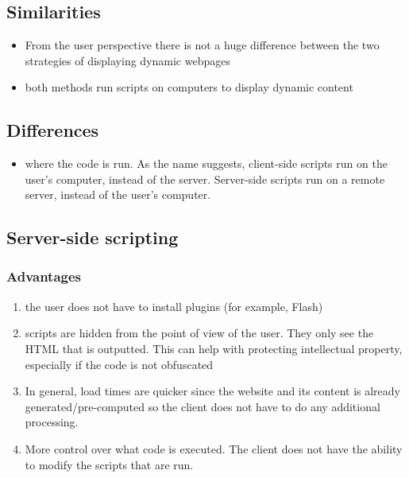 \section{}

\subsection*{Similarities}
\begin{itemize}
  \item From the user perspective there is not a huge difference between the two
    strategies of displaying dynamic webpages
  \item both methods run scripts on computers to display dynamic content
\end{itemize}

\subsection*{Differences}
\begin{itemize}
  \item where the code is run. As the name suggests, client-side scripts run on
    the user's computer, instead of the server. Server-side scripts run on a
    remote server, instead of the user's computer. 
\end{itemize}

\subsection*{Server-side scripting}
\subsubsection*{Advantages}
\begin{enumerate}
  \item the user does not have to install plugins (for example, Flash)
  \item scripts are hidden from the point of view of the user. They only see the
    HTML that is outputted. This can help with protecting intellectual property,
    especially if the code is not obfuscated
  \item In general, load times are quicker since the website and its content is
    already generated/pre-computed so the client does not have to do any
    additional processing.
  \item More control over what code is executed. The client does not have the
    ability to modify the scripts that are run.
\end{enumerate}
